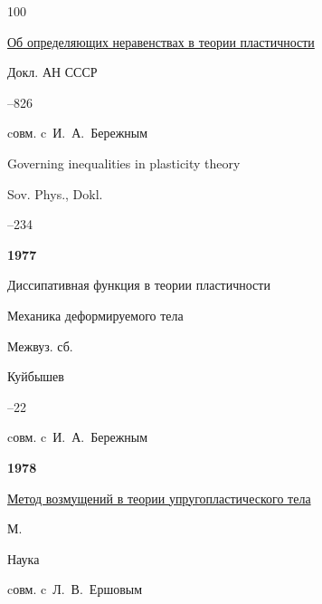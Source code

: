 \begin{thebibliography}{100}

\paper \href{https://zbmath.org/?q=an:0343.73021}{Об определяющих неравенствах в теории пластичности}

\jour Докл. АН СССР




–826

\miscnote cовм. c~И.~А.~Бережным


\transl


\paper Governing inequalities in plasticity theory

\jour Sov. Phys., Dokl. 


--234 




\item[] \centerline{\bf 1977}




\paper Диссипативная функция в теории пластичности 

\inbook Механика деформируемого тела

\bookinfo Межвуз. сб.

\publaddr  Куйбышев



–22 

\miscnote cовм. c~И.~А.~Бережным







\item[] \centerline{\bf 1978}




\book \href{http://www.worldcat.org/oclc/27766556}{Метод возмущений в теории упругопластического тела}

\publaddr М.

\publ Наука



\miscnote cовм. c~Л.~В.~Ершовым






\end{thebibliography}
